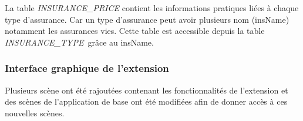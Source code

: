 \documentclass[../rapport.tex]{subfiles}
\begin{document}
		\medskip

		La table \textit{INSURANCE\_PRICE} contient les informations pratiques liées à chaque type d'assurance. Car un type d'assurance peut avoir plusieurs nom (insName) notamment les assurances vies. Cette table est accessible depuis la table \textit{INSURANCE\_TYPE} grâce au insName.

		\subsubsection{Interface graphique de l'extension}

		Plusieurs scène ont été rajoutées contenant les fonctionnalités de l'extension et des scènes de l'application de base ont été modifiées afin de donner accès à ces nouvelles scènes. 
\end{document}
